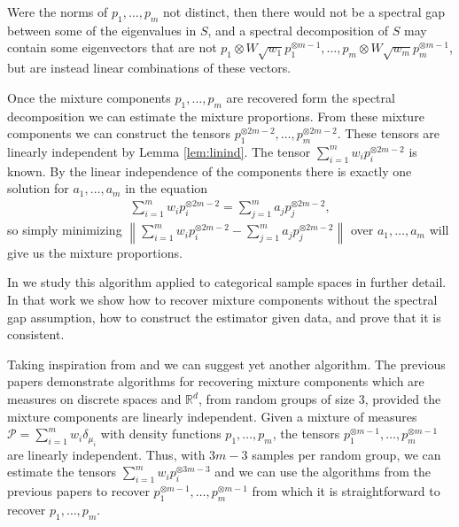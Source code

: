 \documentclass[aos,preprint]{imsart}
\def\rn{\mathbb{R}}
\def\l{\left}
\def\r{\right}
\def\sP{\mathscr{P}}
\theoremstyle{plain}
\theoremstyle{defintion}
\begin{document}
Were the norms of $p_1,\ldots,p_m$ not distinct, then there would not be a spectral gap between some of the eigenvalues in $S$, and a spectral decomposition of $S$ may contain some eigenvectors that are not $ p_1\otimes W \sqrt{w_1}p_1^{\otimes m-1},\ldots,  p_m\otimes W \sqrt{w_m}p_m^{\otimes m-1}$, but are instead linear combinations of these vectors.

Once the mixture components $p_1,\ldots,p_m$ are recovered form the spectral decomposition we can estimate the mixture proportions. From these mixture components we can construct the tensors $p_1^{\otimes 2m-2}, \ldots , p_m^{\otimes 2m-2}$. These tensors are linearly independent by Lemma \ref{lem:linind}. The tensor $ \sum_{i=1}^m w_i p_i^{\otimes 2m-2}$ is known. By the linear independence of the components there is exactly one solution for $a_1,\ldots, a_m$ in the equation
\begin{eqnarray*}
	\sum_{i=1}^m w_i p_i^{\otimes 2m-2} = \sum_{j=1}^m a_j p_j^{\otimes 2m-2},
\end{eqnarray*}
so simply minimizing $\l\|\sum_{i=1}^m w_i p_i^{\otimes 2m-2} - \sum_{j=1}^m a_j p_j^{\otimes 2m-2}\r\|$ over $a_1,\ldots,a_m$ will give us the mixture proportions. 

In \cite{arxiv16} we study this algorithm applied to categorical sample spaces in further detail. In that work we show how to recover mixture components without the spectral gap assumption, how to construct the estimator given data, and prove that it is consistent.

Taking inspiration from \cite{anandkumar14} and \cite{song14} we can suggest yet another algorithm.  The previous papers demonstrate algorithms for recovering mixture components which are measures on discrete spaces and $\rn^d$, from random groups of size 3, provided the mixture components are linearly independent. Given a mixture of measures $\sP = \sum_{i=1}^m w_i \delta_{\mu_i}$ with density functions $p_1,\ldots,p_m$, the tensors $p_1^{\otimes m-1}, \ldots , p_m^{\otimes m-1}$ are linearly independent. Thus, with $3m-3$ samples per random group, we can estimate the tensors $\sum_{i=1}^{m} w_i p_i^{\otimes 3m-3}$ and we can use the algorithms from the previous papers to recover $p_1^{\otimes m-1},\ldots,p_m^{\otimes m-1}$ from which it is straightforward to recover $p_1,\ldots,p_m$.
\end{document}
